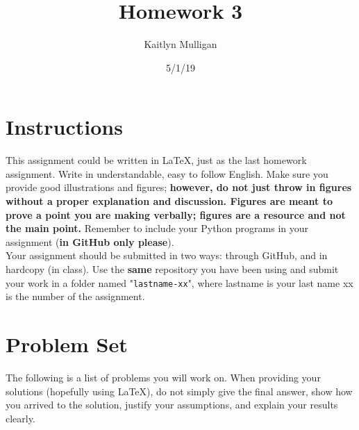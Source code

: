 \documentclass[a4paper]{article}
\title{Homework 3}
\author{Kaitlyn Mulligan}
\date{5/1/19}
\newcommand\tab[1][0.5cm]{\hspace*{#1}}
\begin{document}
\lstset{language=Python}

\maketitle

\section{Instructions}
This assignment could be written in \LaTeX, just as the last homework assignment. Write in 
understandable, easy to follow English. Make sure you provide good illustrations and figures; 
\textbf{however, do not just throw in figures without a proper explanation and discussion.  
Figures are meant to prove a point you are making verbally; figures are a resource and not 
the main point.}  Remember to include your Python programs in your assignment (\textbf{in 
GitHub only please}).\\
\tab Your assignment should be submitted in two ways: through GitHub, and in hardcopy (in class).  
Use the \textbf{same} repository you have been using and submit your work in a folder named 
"\verb|lastname-xx|", where lastname is your last name xx is the number of the assignment.


\section{Problem Set}
The following is a list of problems you will work on. When providing your solutions (hopefully 
using \LaTeX), do not simply give the final answer, show how you arrived to the solution, justify 
your assumptions, and explain your results clearly.

\end{document}
